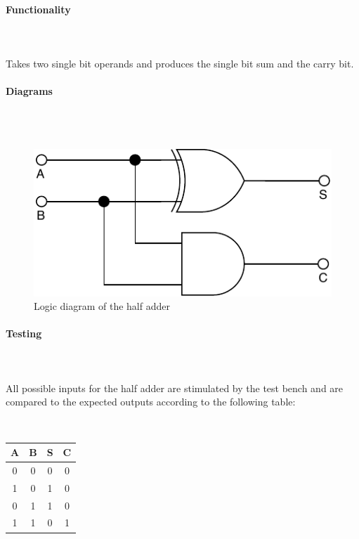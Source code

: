 \documentclass{article}
\begin{document}
    \paragraph{Functionality}
    \hfill\\\\
    Takes two single bit operands and produces the single bit sum and the
    carry bit.

    \paragraph{Diagrams}
    \hfill\\\\
    \begin{figure}[H]
        \centering
        \includegraphics{../diagrams/alu/adder/half_adder.pdf}
        \caption{Logic diagram of the half adder}
    \end{figure}

    \paragraph{Testing}
    \hfill\\\\
    All possible inputs for the half adder are stimulated by the test bench
    and are compared to the expected outputs according to the following
    table:

    \hfill\\
    \begin{tabular}{|c|c||c|c|}
        \hline
        A & B & S & C
        \\\hline\hline
        0 & 0 & 0 & 0
        \\\hline
        1 & 0 & 1 & 0
        \\\hline
        0 & 1 & 1 & 0
        \\\hline
        1 & 1 & 0 & 1
        \\\hline
    \end{tabular}
\end{document}
